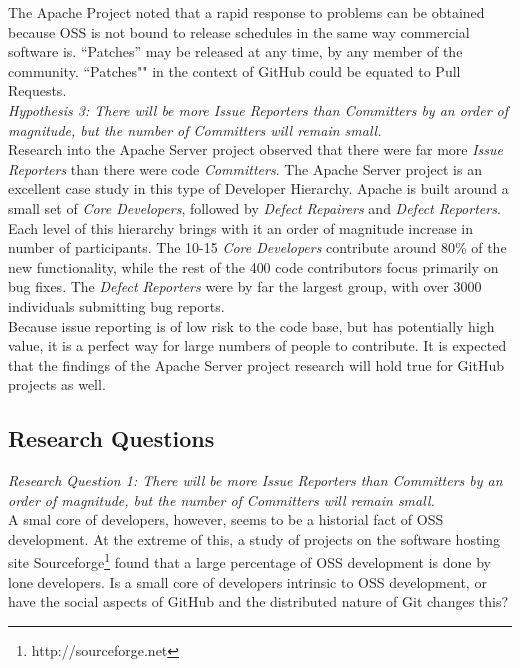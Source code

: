 \documentclass{proc}
\begin{document}
The Apache Project noted that a rapid response to problems can be obtained because OSS is not bound to release schedules in the same way commercial software is. ``Patches'' may be released at any time, by any member of the community\cite{mockus2000case}. ``Patches"" in the context of GitHub could be equated to Pull Requests.\\

\emph{Hypothesis 3: There will be more Issue Reporters than Committers by an order of magnitude, but the number of Committers will remain small.}\\
Research into the Apache Server project observed that there were far more \emph{Issue Reporters} than there were code \emph{Committers}\cite{mockus2000case}. The Apache Server project is an excellent case study in this type of Developer Hierarchy. Apache is built around a small set of {\it Core Developers}, followed by {\it Defect Repairers} and {\it Defect Reporters}. Each level of this hierarchy brings with it an order of magnitude increase in number of participants. The 10-15 {\it Core Developers} contribute around 80\% of the new functionality, while the rest of the 400 code contributors focus primarily on bug fixes. The {\it Defect Reporters} were by far the largest group, with over 3000 individuals submitting bug reports.\\

Because issue reporting is of low risk to the code base, but has potentially high value, it is a perfect way for large numbers of people to contribute. It is expected that the findings of the Apache Server project research will hold true for GitHub projects as well.\\

\subsection{Research Questions}

\emph{Research Question 1: There will be more Issue Reporters than Committers by an order of magnitude, but the number of Committers will remain small.}\\
A smal core of developers, however, seems to be a historial fact of OSS development\cite{mockus2000case,mockus2000two,krishnamurthy2002cave}. At the extreme of this, a study of projects on the software hosting site Sourceforge\footnote{http://sourceforge.net} found that a large percentage of OSS development is done by lone developers. Is a small core of developers intrinsic to OSS development, or have the social aspects of GitHub and the distributed nature of Git changes this?
\end{document}
